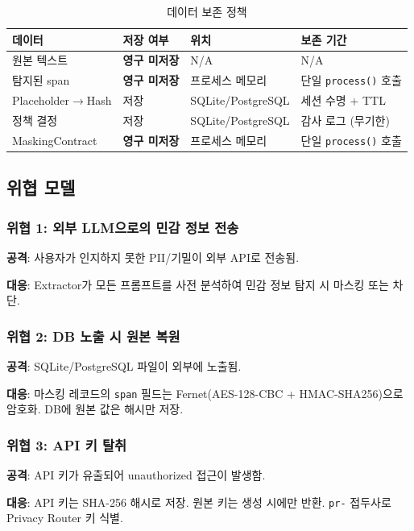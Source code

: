\documentclass[11pt,a4paper]{article}
\begin{document}
\begin{table}[h]
\centering
\begin{tabular}{@{}llll@{}}
\toprule
데이터 & 저장 여부 & 위치 & 보존 기간 \\
\midrule
원본 텍스트 & \textbf{영구 미저장} & N/A & N/A \\
탐지된 span & \textbf{영구 미저장} & 프로세스 메모리 & 단일 \texttt{process()} 호출 \\
Placeholder$\rightarrow$Hash & 저장 & SQLite/PostgreSQL & 세션 수명 + TTL \\
정책 결정 & 저장 & SQLite/PostgreSQL & 감사 로그 (무기한) \\
MaskingContract & \textbf{영구 미저장} & 프로세스 메모리 & 단일 \texttt{process()} 호출 \\
\bottomrule
\end{tabular}
\caption{데이터 보존 정책}
\end{table}

\subsection{위협 모델}

\subsubsection{위협 1: 외부 LLM으로의 민감 정보 전송}

\textbf{공격}: 사용자가 인지하지 못한 PII/기밀이 외부 API로 전송됨.

\textbf{대응}: Extractor가 모든 프롬프트를 사전 분석하여 민감 정보 탐지 시 마스킹 또는 차단.

\subsubsection{위협 2: DB 노출 시 원본 복원}

\textbf{공격}: SQLite/PostgreSQL 파일이 외부에 노출됨.

\textbf{대응}: 마스킹 레코드의 \texttt{span} 필드는 Fernet(AES-128-CBC + HMAC-SHA256)으로 암호화. DB에 원본 값은 해시만 저장.

\subsubsection{위협 3: API 키 탈취}

\textbf{공격}: API 키가 유출되어 unauthorized 접근이 발생함.

\textbf{대응}: API 키는 SHA-256 해시로 저장. 원본 키는 생성 시에만 반환. \texttt{pr-} 접두사로 Privacy Router 키 식별.
\end{document}
